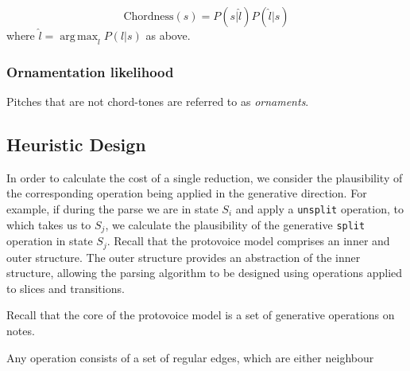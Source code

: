 \documentclass[12pt,a4paper,twoside,openright]{report}
\DeclareMathOperator*{\argmax}{arg\,max}
\theoremstyle{definition}
\begin{document}
\begin{equation}
  \text{Chordness}(s) = P(s | \hat{l}) P(\hat{l} | s) 
  \label{eq:chordness}
\end{equation}
where $\hat{l} = \argmax_l P(l | s)$ as above.

\subsubsection{Ornamentation likelihood}
Pitches that are not chord-tones are referred to as \textit{ornaments}.


\subsection{Heuristic Design}

In order to calculate the cost of a single reduction, we consider the plausibility of the corresponding operation being applied in the generative direction. 
For example, if during the parse we are in state $S_i$ and apply a \texttt{unsplit} operation, to which takes us to $S_j$, we calculate the plausibility of the generative \texttt{split} operation in state $S_j$.
Recall that the protovoice model comprises an inner and outer structure. The outer structure provides an abstraction of the inner structure, allowing the parsing algorithm to be designed using operations applied to slices and transitions.

Recall that the core of the protovoice model is a set of generative operations on notes. 

Any operation consists of a set of regular edges, which are either neighbour
\end{document}
